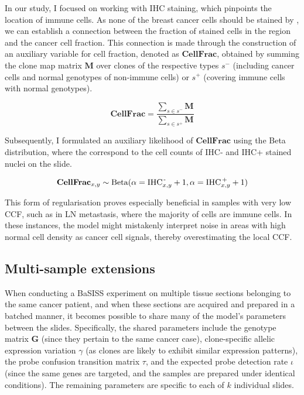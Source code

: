In our study, I focused on working with  \ac{IHC} staining, which pinpoints the location of immune cells. As none of the breast cancer cells should be stained by , we can establish a connection between the fraction of stained cells in the region and the cancer cell fraction. This connection is made through the construction of an auxiliary variable for cell fraction, denoted as $\mathbf{CellFrac}$, obtained by summing the clone map matrix $\mathbf{M}$ over clones of the respective types $s^-$ (including cancer cells and normal genotypes of non-immune cells) or $s^+$ (covering immune cells with normal genotypes).

\begin{equation} 
\mathbf{CellFrac} = \dfrac{\sum_{s \in s^-} \mathbf{M}}{\sum_{s \in s^+} \mathbf{M}}
\end{equation}

Subsequently, I formulated an auxiliary likelihood of $\mathbf{CellFrac}$ using the Beta distribution, where the  correspond to the cell counts of \ac{IHC}- and \ac{IHC}+ stained nuclei on the slide.

\begin{equation} 
\mathbf{CellFrac}_{x,y} \sim \mathrm{Beta}(\alpha=\text{IHC}^\text{\,-}_{x,y} + 1, \alpha=\text{IHC}^\text{\,+}_{x,y} + 1)
\end{equation}

This form of regularisation proves especially beneficial in samples with very low \acl{CCF}, such as in \acl{LN} metastasis, where the majority of cells are immune cells. In these instances, the model might mistakenly interpret noise in areas with high normal cell density as cancer cell signals, thereby overestimating the local \ac{CCF}.

\subsection{Multi-sample extensions}
When conducting a \ac{BaSISS} experiment on multiple tissue sections belonging to the same cancer patient, and when these sections are acquired and prepared in a batched manner, it becomes possible to share many of the model's parameters between the slides. Specifically, the shared parameters include the genotype matrix $\mathbf{G}$ (since they pertain to the same cancer case), clone-specific allelic expression variation $\gamma$ (as clones are likely to exhibit similar expression patterns), the probe confusion transition matrix $\tau$, and the expected probe detection rate $\iota$ (since the same genes are targeted, and the samples are prepared under identical conditions). The remaining parameters are specific to each of $k$ individual slides.

